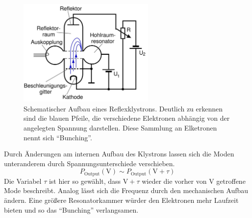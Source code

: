 \begin{figure}
    \centering
    \includegraphics[width=0.6\textwidth]{Bilder/theo.JPG}
    \caption{Schematischer Aufbau eines Reflexklystrons. Deutlich zu erkennen sind die blauen Pfeile, die verschiedene Elektronen abhängig von der angelegten Spannung darstellen. 
    Diese Sammlung an Elketronen nennt sich \enquote{Bunching}.} 
    \label{fig:ref}
\end{figure}
Durch Änderungen am internen Aufbau des Klystrons lassen sich die Moden unteranderem durch Spannungsunterschiede verschieben. 
\begin{equation*}
    P_{\text{Output}} (\si{\volt}) \sim P_{\text{Output}} (\si{\volt} + \tau)
\end{equation*}
Die Variabel $\tau$ ist hier so gewählt, dass $\si{\volt} + \tau$ wieder die vorher von $\si{\volt}$ getroffene Mode beschreibt.
Analog lässt sich die Frequenz durch den mechanischen Aufbau ändern. Eine größere Resonatorkammer würder den Elektronen 
mehr Laufzeit bieten und so das \enquote{Bunching} verlangsamen.

\newpage 

